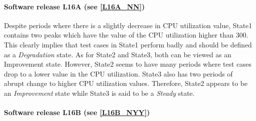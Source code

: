 \paragraph{Software release L16A (see \ref{L16A_NN})}

\begin{comment}
\begin{itemize}
\item State1

Despite periods where there is a slightly decrease in CPU utilization
value, State1 contains two peaks which have the value of the CPU utilization
higher than 300. This clearly implies that test cases in State1 perform
badly and  is defined as a \emph{Degradation} state. 
\item State2 

The state appears to be an \emph{Improvement} state as there are many
periods where test cases have low value in the CPU utilization.
\item State3 

The performance for test cases in this state can be viewed as a \emph{Good}
state as well. However, State2 seems to capture the period where test
cases have lowest values better than State3, and State3 has two periods
of increasing to higher CPU utilization values. The state is, therefore,
said to be a \emph{Steady} state.
\end{itemize}
\end{comment}

Despite periods where there is a slightly decrease in CPU utilization
value, State1 contains two peaks which have the value of the CPU utilization
higher than 300. This clearly implies that test cases in State1 perform
badly and should be defined as a \emph{Degradation} state. As for
State2 and State3, both can be viewed as an Improvement state. However,
State2 seems to have many periods where test cases drop to a lower
value in the CPU utilization. State3 also has two periods of abrupt
change to higher CPU utilization values. Therefore, State2 appears
to be an \emph{Improvement} state while State3 is said to be a \emph{Steady}
state.

\paragraph*{Software release L16B (see \ref{L16B_NYY})}

